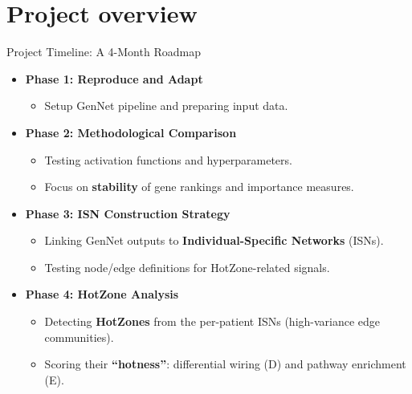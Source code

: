 \documentclass[aspectratio=169]{beamer}
\begin{document}
\section{Project overview}

\begin{frame}{Project Timeline: A 4-Month Roadmap}
    \begin{itemize}
        \item<1-> \textbf{Phase 1: Reproduce and Adapt}
            \begin{itemize}
                \item Setup GenNet pipeline and preparing input data.
            \end{itemize}
        \vspace{0.3cm}
        \item<2-> \textbf{Phase 2: Methodological Comparison}
            \begin{itemize}
                \item Testing activation functions and hyperparameters.
                \item Focus on \textbf{stability} of gene rankings and importance measures.
            \end{itemize}
        \vspace{0.3cm}
        \item<3-> \textbf{Phase 3: ISN Construction Strategy}
            \begin{itemize}
                \item Linking GenNet outputs to \textbf{Individual-Specific Networks} (ISNs).
                \item Testing node/edge definitions for HotZone-related signals.
            \end{itemize}
        \vspace{0.3cm}
        \item<4-> \textbf{Phase 4: HotZone Analysis}
            \begin{itemize}
                \item Detecting \textbf{HotZones} from the per-patient ISNs (high-variance edge communities).
                \item Scoring their \textbf{``hotness''}: differential wiring (D) and pathway enrichment (E).
            \end{itemize}
    \end{itemize}
\end{frame}
\end{document}
